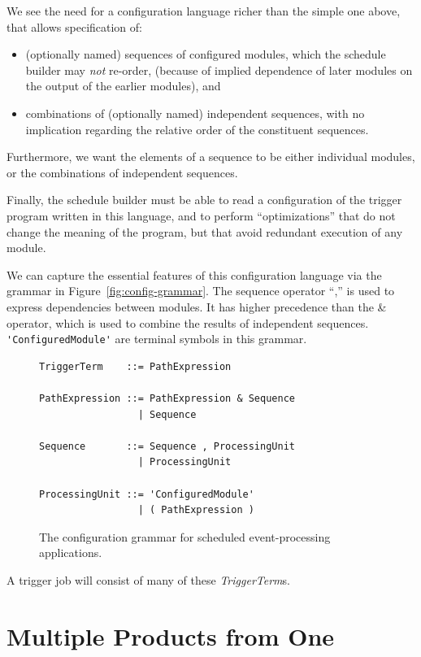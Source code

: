 \documentclass[draftmode]{memarticle}
\newcommand{\EDProducer}{\classname{ED\-Producer}}
\begin{document}
We see the need for a configuration language
richer than the simple one above,
that allows specification of:
\begin{itemize}

\item
(optionally named) sequences of configured modules,
which the schedule builder may \emph{not} re-order,
(because of implied dependence of later modules on
the output of the earlier modules), and

\item
combinations of (optionally named) independent sequences,
with no implication regarding the relative order
of the constituent sequences.

\end{itemize}

Furthermore,
we want the elements of a sequence to be either individual modules,
or the combinations of independent sequences.

Finally,
the schedule builder must be able to read a configuration 
of the trigger program
written in this language,
and to perform ``optimizations'' that do not
change the meaning of the program,
but that avoid redundant execution of any module.

We can capture the essential features
of this configuration language
via the grammar in Figure~\vref{fig:config-grammar}.
The sequence operator ``,'' is used to express dependencies between modules.
It has higher precedence than the \& operator,
which is used to combine the results of independent sequences.
\verb!'ConfiguredModule'! are terminal symbols
in this grammar.
\begin{figure}[h]
\begin{verbatim}
TriggerTerm    ::= PathExpression

PathExpression ::= PathExpression & Sequence
                 | Sequence

Sequence       ::= Sequence , ProcessingUnit
                 | ProcessingUnit

ProcessingUnit ::= 'ConfiguredModule'
                 | ( PathExpression )
\end{verbatim}
\caption{The configuration grammar for scheduled event-processing applications.}
\label{fig:config-grammar}
\end{figure}

A trigger job will consist of many of these \emph{TriggerTerm}s.

\section{Multiple Products from One \EDProducer}\label{sec:multipleproducts}
\end{document}
